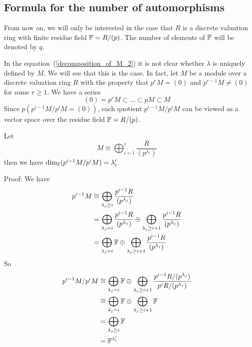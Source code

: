 \subsection{Formula for the number of automorphisms}
From now on, we will only be interested in the case that $R$ is a discrete valuation ring with finite residue field $\mathbb{F}=R/(p)$. The number of elements of $\mathbb{F}$ will be denoted by $q$.\par
In the equation~(\ref{decomposition_of_M_2}) it is not clear whether $\lambda$ is uniquely defined by $M$. We will see that this is the case. In fact, let $M$ be a module over a discrete valuation ring $R$ with the property that $p^{r}M=(0)$ and $p^{r-1}M\neq(0)$ for some $r\geq1$. We have a series
\begin{equation}\label{chain_of_modules_pM}
    (0)=p^{r}M\subset \dots \subset pM\subset M
\end{equation}
Since $p\left(p^{i-1}M/p^{i}M=(0)\right)$, each quotient $p^{i-1}M/p^{i}M$ can be viewed as a vector space over the residue field $\mathbb{F}=R/(p)$. 
\begin{dang}
    \begin{theorem}\label{dim_of_M_over_pM}\cite{macdonald1998symmetric}
        Let
        \begin{equation}
             M\cong\bigoplus_{i=1}^r\frac{R}{(p^{\lambda_i})}
        \end{equation}
        then we have $\text{dim}_{\mathbb{F}}(p^{i-1}M/p^{i}M)=\lambda_i^\prime$.
    \end{theorem}
\end{dang}
Proof: We have
\begin{equation}
\begin{split}
     p^{i-1}M &\cong \bigoplus_{\lambda_j\geq i}\frac{p^{i-1}R}{(p^{\lambda_j})} \\
              &= \bigoplus_{\lambda_j=i}\frac{p^{i-1}R}{(p^{\lambda_j})}\oplus\bigoplus_{\lambda_j\geq i+1}\frac{p^{i-1}R}{(p^{\lambda_j})}\\
              &= \bigoplus_{\lambda_j=i}\mathbb{F}\oplus\bigoplus_{\lambda_j\geq i+1}\frac{p^{i-1}R}{(p^{\lambda_j})}
\end{split} 
\end{equation}
So
\begin{equation}
\begin{split}
     p^{i-1}M/p^iM&\cong \bigoplus_{\lambda_j=i}\mathbb{F}\oplus\bigoplus_{\lambda_j\geq i+1}\frac{p^{i-1}R/(p^{\lambda_j})}{p^{i}R/(p^{\lambda_j})}\\
     &\cong \bigoplus_{\lambda_j=i}\mathbb{F}\oplus\bigoplus_{\lambda_j\geq i+1}\mathbb{F}\\
     &=\bigoplus_{\lambda_j\geq i}\mathbb{F}\\
     &=\mathbb{F}^{\lambda_i^\prime}
\end{split} 
\end{equation}
